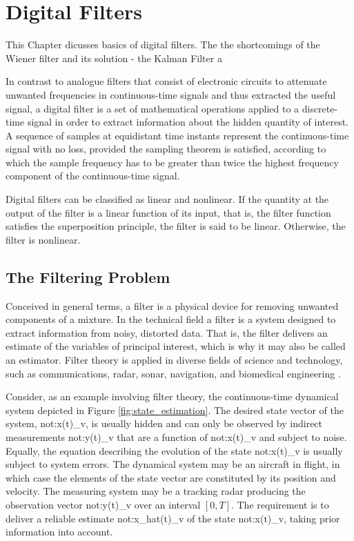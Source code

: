 \chapter{Digital Filters}
\label{ch:kalman}

This Chapter dicusses basics of digital filters. The 
the shortcomings of the Wiener filter and its solution - the Kalman Filter a

In contrast to analogue filters that consist of electronic circuits to attenuate unwanted frequencies in continuous-time signals and thus extracted the useful signal, a digital filter is a set of mathematical operations applied to a discrete-time signal in order to extract information about the hidden quantity of interest. A sequence of samples at equidistant time instants represent the continuous-time signal with no loss, provided the sampling theorem is satisfied, according to which the sample frequency has to be greater than twice the highest frequency component of the continuous-time signal.

Digital filters can be classified as linear and nonlinear. If the quantity at the output of the filter is a linear function of its input, that is, the filter function satisfies the superposition principle, the filter is said to be linear. Otherwise, the filter is nonlinear.

\section{The Filtering Problem}

Conceived in general terms, a filter is a physical device for removing unwanted components of a mixture. In the technical field a filter is a system designed to extract information from noisy, distorted data. That is, the filter delivers an estimate of the variables of principal interest, which is why it may also be called an estimator. Filter theory is applied in diverse fields of science and technology, such as communications, radar, sonar, navigation, and biomedical engineering \cite{haykin2002adaptive}.

Consider, as an example involving filter theory, the continuous-time dynamical system depicted in Figure \ref{fig:state_estimation}. The desired state vector of the system, \gls{not:x(t)_v}, is usually hidden and can only be observed by indirect measurements \gls{not:y(t)_v} that are a function of \gls{not:x(t)_v} and subject to noise. Equally, the equation describing the evolution of the state \gls{not:x(t)_v} is usually subject to system errors. The dynamical system may be an aircraft in flight, in which case the elements of the state vector are constituted by its position and velocity. The measuring system may be a tracking radar producing the observation vector \gls{not:y(t)_v} over an interval $[0, T]$. The requirement is to deliver a reliable estimate \gls{not:x_hat(t)_v} of the state \gls{not:x(t)_v}, taking prior information into account.


